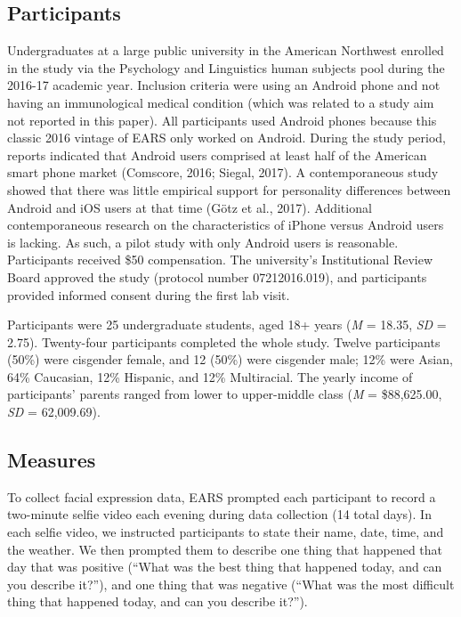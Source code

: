 \documentclass[authordate, empirical,issue]{jote-new-article}
\begin{document}
\subsection{Participants}



Undergraduates at a large public university in the American Northwest enrolled in the study via the Psychology and Linguistics human subjects pool during the 2016-17 academic year. Inclusion criteria were using an Android phone and not having an immunological medical condition (which was related to a study aim not reported in this paper). All participants used Android phones because this classic 2016 vintage of EARS only worked on Android. During the study period, reports indicated that Android users comprised at least half of the American smart phone market (Comscore, 2016; Siegal, 2017). A contemporaneous study showed that there was little empirical support for personality differences between Android and iOS users at that time (Götz et al., 2017). Additional contemporaneous research on the characteristics of iPhone versus Android users is lacking. As such, a pilot study with only Android users is reasonable. Participants received \$50 compensation. The university's Institutional Review Board approved the study (protocol number 07212016.019), and participants provided informed consent during the first lab visit.



Participants were 25 undergraduate students, aged 18+ years (\emph{M} = 18.35, \emph{SD} = 2.75). Twenty-four participants completed the whole study. Twelve participants (50\%) were cisgender female, and 12 (50\%) were cisgender male; 12\% were Asian, 64\% Caucasian, 12\% Hispanic, and 12\% Multiracial. The yearly income of participants' parents ranged from lower to upper-middle class (\emph{M} = \$88,625.00, \emph{SD} = 62,009.69).







\subsection{Measures}



To collect facial expression data, EARS prompted each participant to record a two-minute selfie video each evening during data collection (14 total days). In each selfie video, we instructed participants to state their name, date, time, and the weather. We then prompted them to describe one thing that happened that day that was positive (“What was the best thing that happened today, and can you describe it?”), and one thing that was negative (“What was the most difficult thing that happened today, and can you describe it?”).
\end{document}
